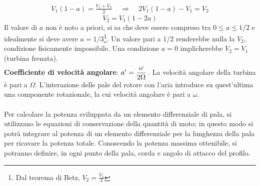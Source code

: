 \begin{align*}
V_1 (1-a) = \frac{V_1 +V_2}{2} \;\;\;\; \Rightarrow \;\;\;\; 2 V_1 (1-a) - V_1 = V_2
\end{align*}
\begin{equation}
\boxed{V_2 = V_1 (1-2a)}
\end{equation}
Il valore di $a$ non è noto a priori, si sa che deve essere compreso tra $0 \leq a \leq 1/2$ e idealmente si deve avere $a = 1/3$\footnote{Dal teorema di Betz, $V_2=\frac{V_1}{3}$}. Un valore pari a $1/2$ renderebbe nulla la $V_2$, condizione fisicamente impossibile. Una condizione $a=0$ implicherebbe $V_2 = V_1$ (turbina frenata).\\
\textbf{Coefficiente di velocità angolare}: $a' = \cfrac{\omega}{2 \Omega}$ .
La velocità angolare della turbina è pari a $\Omega$. L'interazione delle pale del rotore con l'aria introduce su quest'ultima una componente rotazionale, la cui velocità angolare è pari a $\omega$.\\
\\
Per calcolare la potenza sviluppata da un elemento differenziale di pala, si utilizzano le equazioni di conservazione della quantità di moto; in questo modo si potrà integrare al potenza di un elemento differenziale per la lunghezza della pala per ricavare la potenza totale. Conoscendo la potenza massima ottenibile, si potranno definire, in ogni punto della pala, corda e angolo di attacco del profilo.

